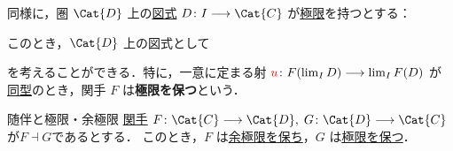 \documentclass[TQFT_main]{subfiles}
\begin{document}
同様に，圏 $\Cat{D}$ 上の\hyperref[def:diagram]{図式} $D \colon I \lto \Cat{C}$ が\hyperref[def:lim]{極限}を持つとする：
\begin{center}
\end{center}
このとき，$\Cat{D}$ 上の図式として
\begin{center}
\end{center}
を考えることができる．特に，一意に定まる射 $\textcolor{red}{u} \colon F(\lim_I D) \longrightarrow \lim_I F(D)$ が\hyperref[def:iso]{同型}のとき，関手 $F$ は\textbf{極限を保つ}\label{def:preserve-lim}という．

\begin{myprop}[label=prop:adj-lim]{随伴と極限・余極限}
    \hyperref[def:functor]{関手} $F \colon \Cat{C} \lto \Cat{D},\; G \colon \Cat{D} \lto \Cat{C}$ が\hyperref[def:adjoint]{$F \dashv G$}であるとする．
    このとき，$F$ は\hyperref[def:preserve-colim]{余極限を保ち}，$G$ は\hyperref[def:preserve-lim]{極限を保つ}．
\end{myprop}
\end{document}
